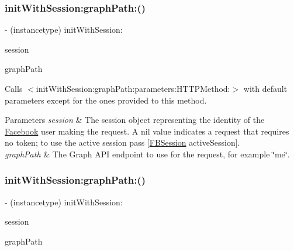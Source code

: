 \subsubsection{\texorpdfstring{init\+With\+Session\+:graph\+Path\+:()}{initWithSession:graphPath:()}\hspace{0.1cm}{\footnotesize\ttfamily [3/5]}}
{\footnotesize\ttfamily -\/ (instancetype) init\+With\+Session\+: \begin{DoxyParamCaption}\item[{(\hyperlink{interfaceFBSession}{F\+B\+Session} $\ast$)}]{session }\item[{graphPath:(N\+S\+String $\ast$)}]{graph\+Path }\end{DoxyParamCaption}}

Calls $<$init\+With\+Session\+:graph\+Path\+:parameters\+:\+H\+T\+T\+P\+Method\+:$>$ with default parameters except for the ones provided to this method.


\begin{DoxyParams}{Parameters}
{\em session} & The session object representing the identity of the \hyperlink{interfaceFacebook}{Facebook} user making the request. A nil value indicates a request that requires no token; to use the active session pass {\ttfamily \mbox{[}\hyperlink{interfaceFBSession}{F\+B\+Session} active\+Session\mbox{]}}.\\
\hline
{\em graph\+Path} & The Graph A\+PI endpoint to use for the request, for example \char`\"{}me\char`\"{}. \\
\hline
\end{DoxyParams}
\mbox{\label{interfaceFBRequest_abf08647708e28e2fe5422e90680bd9dc}} 
\subsubsection{\texorpdfstring{init\+With\+Session\+:graph\+Path\+:()}{initWithSession:graphPath:()}\hspace{0.1cm}{\footnotesize\ttfamily [4/5]}}
{\footnotesize\ttfamily -\/ (instancetype) init\+With\+Session\+: \begin{DoxyParamCaption}\item[{(\hyperlink{interfaceFBSession}{F\+B\+Session} $\ast$)}]{session }\item[{graphPath:(N\+S\+String $\ast$)}]{graph\+Path }\end{DoxyParamCaption}}

